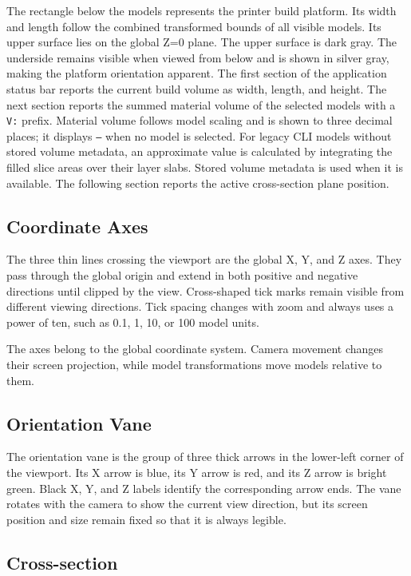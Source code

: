 The rectangle below the models represents the printer build platform. Its
width and length follow the combined transformed bounds of all visible models.
Its upper surface lies on the global Z=0 plane.
The upper surface is dark gray. The underside remains visible when viewed from
below and is shown in silver gray, making the platform orientation apparent.
The first section of the application status bar reports the current build
volume as width, length, and height. The next section reports the summed
material volume of the selected models with a \texttt{V:} prefix. Material
volume follows model scaling and is shown to three decimal places; it displays
\texttt{--} when no model is selected. For legacy CLI models without stored
volume metadata, an approximate value is calculated by integrating the filled
slice areas over their layer slabs. Stored volume metadata is used when it is
available. The following section reports the active cross-section plane
position.

\subsection{Coordinate Axes}

The three thin lines crossing the viewport are the global X, Y, and Z axes.
They pass through the global origin and extend in both positive and negative
directions until clipped by the view. Cross-shaped tick marks remain visible
from different viewing directions. Tick spacing changes with zoom and always
uses a power of ten, such as 0.1, 1, 10, or 100 model units.

The axes belong to the global coordinate system. Camera movement changes their
screen projection, while model transformations move models relative to them.

\subsection{Orientation Vane}

The orientation vane is the group of three thick arrows in the lower-left
corner of the viewport. Its X arrow is blue, its Y arrow is red, and its Z
arrow is bright green. Black X, Y, and Z labels identify the corresponding
arrow ends. The vane rotates with the camera to show the current view
direction, but its screen position and size remain fixed so that it is always
legible.

\subsection{Cross-section}
\label{section-dialog}

